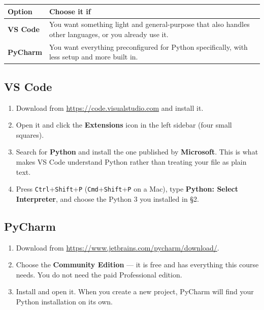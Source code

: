 \documentclass[11pt]{article}
\begin{document}
\begin{center}
\renewcommand{\arraystretch}{1.5}
\begin{tabular}{@{}l p{9.6cm}@{}}
\toprule
\textbf{Option} & \textbf{Choose it if} \\
\midrule
\textbf{VS Code} & You want something light and general-purpose that also
                   handles other languages, or you already use it. \\
\textbf{PyCharm} & You want everything preconfigured for Python specifically,
                   with less setup and more built in. \\
\bottomrule
\end{tabular}
\end{center}

\subsection{VS Code}
\begin{enumerate}[leftmargin=2.0em,itemsep=4pt]
  \item Download from \url{https://code.visualstudio.com} and install it.
  \item Open it and click the \textbf{Extensions} icon in the left sidebar (four
        small squares).
  \item Search for \textbf{Python} and install the one published by
        \textbf{Microsoft}. This is what makes VS Code understand Python rather
        than treating your file as plain text.
  \item Press \texttt{Ctrl}+\texttt{Shift}+\texttt{P}
        (\texttt{Cmd}+\texttt{Shift}+\texttt{P} on a Mac), type
        \textbf{Python: Select Interpreter}, and choose the Python 3 you
        installed in \S2.
\end{enumerate}

\subsection{PyCharm}
\begin{enumerate}[leftmargin=2.0em,itemsep=4pt]
  \item Download from \url{https://www.jetbrains.com/pycharm/download/}.
  \item Choose the \textbf{Community Edition} --- it is free and has everything
        this course needs. You do not need the paid Professional edition.
  \item Install and open it. When you create a new project, PyCharm will find
        your Python installation on its own.
\end{enumerate}
\end{document}
